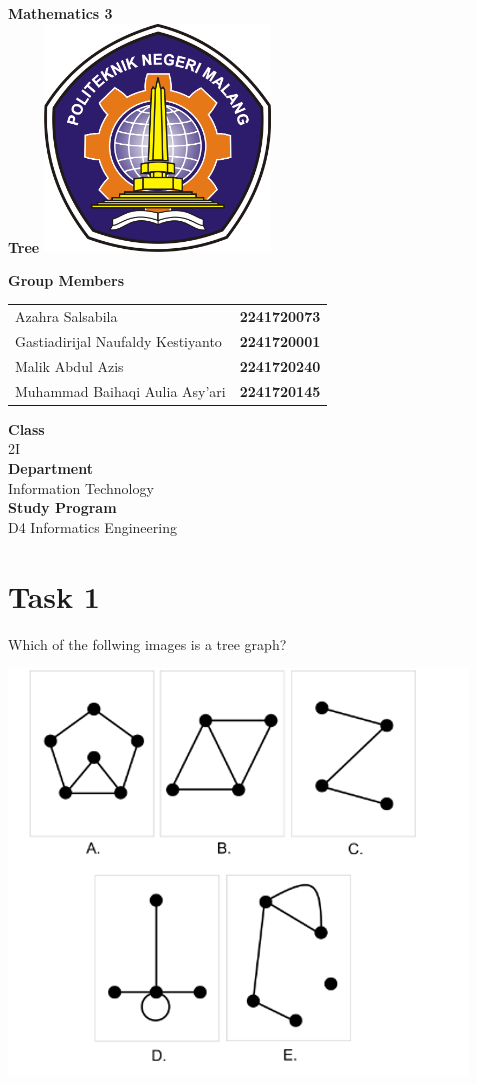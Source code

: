 \documentclass[12pt,titlepage]{article}
\newcommand{\vSubject}{Mathematics 3}
\newcommand{\vSubtitle}{Tree}
\newcommand{\vClass}{2I}
\newcommand{\vDepartment}{Information Technology}
\newcommand{\vStudyProgram}{D4 Informatics Engineering}
\begin{document}
\begin{titlepage}
    \centering
    \vfill
    {\bfseries\LARGE
        \vSubject\\
        \vskip0.25cm
        \vSubtitle
    }
    \vfill
    \includegraphics[width=6cm]{images/polinema-logo.png}
    \vfill
    {
        \textbf{Group Members}\\
        \vspace{0.5cm}
        \begin{tabular}{l l}
            Azahra Salsabila & \textbf{2241720073} \\
            Gastiadirijal Naufaldy Kestiyanto & \textbf{2241720001} \\
            Malik Abdul Azis & \textbf{2241720240}\\
            Muhammad Baihaqi Aulia Asy'ari & \textbf{2241720145} \\
        \end{tabular}
        \vskip0.5cm
        \textbf{Class}\\
        \vClass\\
        \vskip0.5cm
        \textbf{Department}\\
        \vDepartment\\
        \vskip0.5cm
        \textbf{Study Program}\\
        \vStudyProgram
    }
\end{titlepage}

\newpage

\section*{Task 1}
Which of the follwing images is a tree graph?
\begin{center}
    \includegraphics[width=.6\textwidth]{images/figures/fig1.png}
\end{center}
\end{document}
